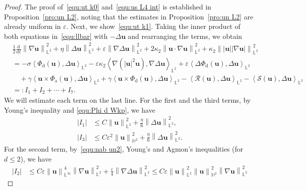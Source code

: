 \documentclass[11pt, reqno]{amsart}
\theoremstyle{definition}
\numberwithin{equation}{section}
\newcommand{\bff}{\boldsymbol}
\newcommand{\bb}{\mathbb}
\newcommand{\ddt}{\frac{\mathrm{d}}{\mathrm{d}t}}
\newcommand{\norm}[2]{\left\|{#1}\right\|_{#2}}
\newcommand{\inpro}[2]{\left\langle#1,#2\right\rangle}
\newcommand{\abs}[1]{\left|{#1}\right|}
\begin{document}
\begin{proof}
The proof of~\eqref{equ:ut k0} and~\eqref{equ:us L4 int} is established in Proposition~\ref{pro:un L2}, noting that the estimates in Proposition~\ref{pro:un L2} are already uniform in $\varepsilon$. Next, we show~\eqref{equ:ut k1}.
Taking the inner product of both equations in~\eqref{equ:llbar} with $-\Delta \bff{u}$ and rearranging the terms, we obtain
\begin{align}\label{equ:ddt nab u L2}
    &\frac12 \ddt \norm{\nabla \bff{u}}{\bb{L}^2}^2
    +
    \eta \norm{\Delta \bff{u}}{\bb{L}^2}^2
    +
    \varepsilon \norm{\nabla\Delta \bff{u}}{\bb{L}^2}^2
    +
    2\kappa_2 \norm{\bff{u}\cdot \nabla \bff{u}}{\bb{L}^2}^2
    +
    \kappa_2 \norm{|\bff{u}| |\nabla\bff{u}|}{\bb{L}^2}^2
    \nonumber \\
    &=
    -\sigma \inpro{\Phi_{\mathrm{d}}(\bff{u})}{\Delta \bff{u}}_{\bb{L}^2}
    -
    \varepsilon \kappa_2 \inpro{\nabla(|\bff{u}|^2 \bff{u})}{\nabla\Delta \bff{u}}_{\bb{L}^2}
    +
    \varepsilon \inpro{\Delta \Phi_{\mathrm{d}}(\bff{u})}{\Delta \bff{u}}_{\bb{L}^2}
    \nonumber \\
    &\quad
    +
    \gamma \inpro{\bff{u}\times \Phi_{\mathrm{a}}(\bff{u})}{\Delta \bff{u}}_{\bb{L}^2}
    +
    \gamma \inpro{\bff{u}\times \Phi_{\mathrm{d}}(\bff{u})}{\Delta \bff{u}}_{\bb{L}^2}
    -
    \inpro{\mathcal{R}(\bff{u})}{\Delta \bff{u}}_{\bb{L}^2}
    -
    \inpro{\mathcal{S}(\bff{u})}{\Delta \bff{u}}_{\bb{L}^2}
    \nonumber \\
    &=: I_1+I_2+\cdots+I_7.
\end{align}
We will estimate each term on the last line. For the first and the third terms, by Young's inequality and \eqref{equ:Phi d Wkp}, we have
\begin{align*}
    \abs{I_1}
    &\leq
    C \norm{\bff{u}}{\bb{L}^2}^2 + \frac{\eta}{6} \norm{\Delta \bff{u}}{\bb{L}^2}^2,
    \\
    \abs{I_3}
    &\leq
    C\varepsilon^2 \norm{\bff{u}}{\bb{H}^2}^2 + \frac{\eta}{6} \norm{\Delta \bff{u}}{\bb{L}^2}^2.
\end{align*}
For the second term, by~\eqref{equ:nab un2}, Young's and Agmon's inequalities (for $d\leq 2$), we have
\begin{align*}
    \abs{I_2}
    &\leq
    C\varepsilon \norm{\bff{u}}{\bb{L}^\infty}^4 \norm{\nabla \bff{u}}{\bb{L}^2}^2
    +
    \frac{\varepsilon}{4} \norm{\nabla\Delta \bff{u}}{\bb{L}^2}^2
    \leq
    C\varepsilon \norm{\bff{u}}{\bb{L}^2}^2 \norm{\bff{u}}{\bb{H}^2}^2 \norm{\nabla \bff{u}}{\bb{L}^2}^2

\end{align*}
\end{proof}
\end{document}
